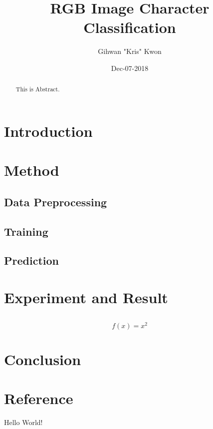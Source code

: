 \documentclass[12]{article}
\title{\textbf{RGB Image Character Classification}}
\date{Dec-07-2018}
\author{Gihwan "Kris" Kwon}
\begin{document}
    \maketitle
    \begin{abstract}
        This is Abstract.
        \vspace{1in}
    \end{abstract}

    \section{Introduction}
        

    \section{Method}
        
        \subsection{Data Preprocessing}
            
        \subsection{Training}
            
        \subsection{Prediction}
            

    \section{Experiment and Result}
        \subsection{}
        \paragraph{}
        \subparagraph{}
        \begin{equation}
            f(x) = x^2
        \end{equation}
    \section{Conclusion}

    \section{Reference}


    Hello World!
\end{document}
